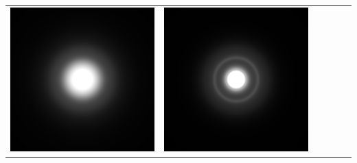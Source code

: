 \begin{teaserfigure}
    \centering
    \setlength{\resLen}{1.12in}
    \addtolength{\tabcolsep}{-3.5pt}
    \small
    \begin{tabular}{cccccc}
        \includegraphics[height=\resLen]{images/slab/N1_300nm.jpg} &
        \includegraphics[height=\resLen]{images/slab/N100_300nm.jpg} &

\end{tabular}
\end{teaserfigure}
